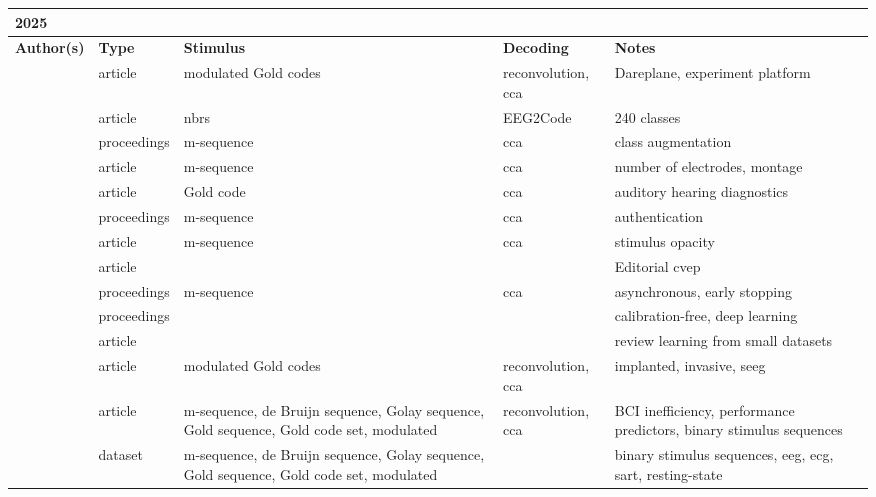\documentclass[a4paper,landscape]{article}
\begin{document}
	
\begin{table}[H]
	\begin{tabular}{p{5cm}p{2cm}p{5cm}p{5cm}p{6.5cm}}
		\textbf{2025} & & & & \\ 
		\toprule
		\textbf{Author(s)} & \textbf{Type} & \textbf{Stimulus} & \textbf{Decoding} & \textbf{Notes} \\ 
		\midrule
		\citeauthor{dold2025} & article & modulated Gold codes & reconvolution, \acrshort{cca} & Dareplane, experiment platform \\
		\citeauthor{dong2025} & article & \acrshort{nbrs} & EEG2Code & 240 classes \\
		\citeauthor{fodor2025a} & proceedings & m-sequence & \acrshort{cca} & class augmentation \\
		\citeauthor{fodor2025a} & article & m-sequence & \acrshort{cca} & number of electrodes, montage \\
		\citeauthor{guyonnet2025} & article & Gold code & \acrshort{cca} & auditory hearing diagnostics \\
		\citeauthor{le2025} & proceedings & m-sequence & \acrshort{cca} & authentication \\
		\citeauthor{martinfernandez2025} & article & m-sequence & \acrshort{cca} & stimulus opacity \\
		\citeauthor{martinezcagigal2025a} & article &  &  & Editorial \acrshort{cvep} \\
		\citeauthor{martinezcagigal2025b} & proceedings &  m-sequence & \acrshort{cca} & asynchronous, early stopping \\
		\citeauthor{santamaria2025} & proceedings & & & calibration-free, deep learning \\
		\citeauthor{tangermann2025} & article & & & review learning from small datasets \\
		\citeauthor{thielen2025a} & article & modulated Gold codes & reconvolution, \acrshort{cca} & implanted, invasive, \acrshort{seeg} \\
		\citeauthor{thielen2025b} & article & m-sequence, de Bruijn sequence, Golay sequence, Gold sequence, Gold code set, modulated & reconvolution, \acrshort{cca} & BCI inefficiency, performance predictors, binary stimulus sequences \\
		\citeauthor{thielen2025dataset} & dataset & m-sequence, de Bruijn sequence, Golay sequence, Gold sequence, Gold code set, modulated & & binary stimulus sequences, \acrshort{eeg}, \acrshort{ecg}, \acrshort{sart}, resting-state \\
		\bottomrule
	\end{tabular}
\end{table}
	
\end{document}
